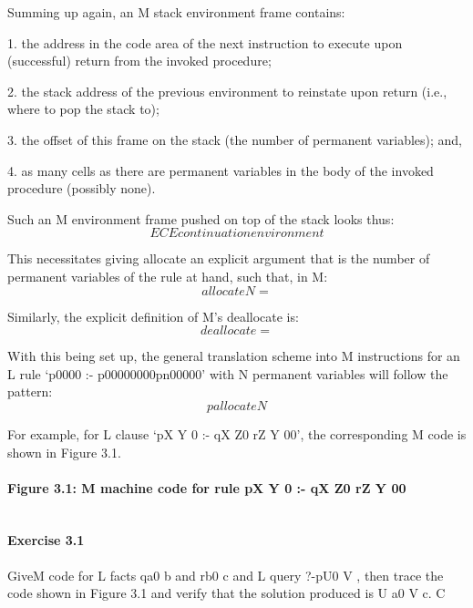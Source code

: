 Summing up again, an M stack environment frame contains:

1. the address in the code area of the next instruction to execute upon (successful)
return from the invoked procedure;

2. the stack address of the previous environment to reinstate upon return (i.e.,
where to pop the stack to);

3. the offset of this frame on the stack (the number of permanent variables);
and,

4. as many cells as there are permanent variables in the body of the invoked
procedure (possibly none).

Such an M environment frame pushed on top of the stack looks thus:
\[E CE continuation environment\]

This necessitates giving allocate an explicit argument that is the number of
permanent variables of the rule at hand, such that, in M:
\[allocate N =\]

Similarly, the explicit definition of M’s deallocate is:
\[deallocate  =\]

With this being set up, the general translation scheme into M instructions for an
L rule ‘p0000
:- p00000000pn00000’
with N permanent variables will follow
the pattern:
\[p allocate N\]

For example, for L clause ‘pX
Y 0 :- qX
Z0
rZ
Y 00’, the corresponding
M code is shown in Figure 3.1.

\paragraph{Figure 3.1: M machine code for rule pX
Y 0 :- qX
Z0
rZ
Y 00}
\begin{verbatim}

\end{verbatim}

\paragraph{Exercise 3.1} GiveM code for L facts qa0 b and rb0 c and L query
?-pU0 V , then trace the code shown in Figure 3.1 and verify that the solution produced is
U 
 a0 V 
 c.
C  

